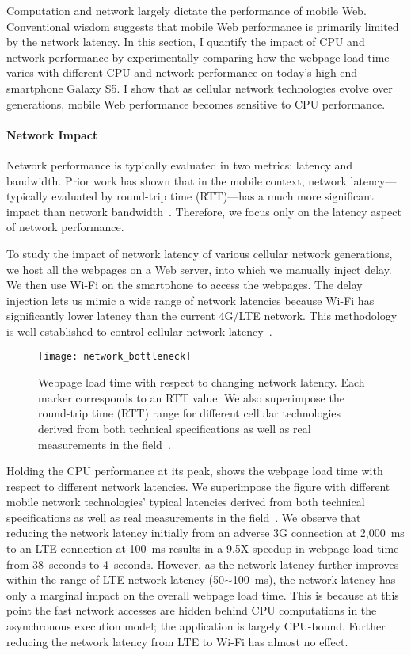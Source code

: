 Computation and network largely dictate the performance of mobile Web. Conventional wisdom suggests that mobile Web performance is primarily limited by the network latency. In this section, I quantify the impact of CPU and network performance by experimentally comparing how the webpage load time varies with different CPU and network performance on today's high-end smartphone Galaxy S5. I show that as cellular network technologies evolve over generations, mobile Web performance becomes sensitive to CPU performance.

\paragraph{Network Impact} Network performance is typically evaluated in two metrics: latency and bandwidth. Prior work has shown that in the mobile context, network latency---typically evaluated by round-trip time (RTT)---has a much more significant impact than network bandwidth~\cite{HPBN,browser-slow}. Therefore, we focus only on the latency aspect of network performance.

To study the impact of network latency of various cellular network generations, we host all the webpages on a Web server, into which we manually inject delay. We then use Wi-Fi on the smartphone to access the webpages. The delay injection lets us mimic a wide range of network latencies because Wi-Fi has significantly lower latency than the current 4G/LTE network. This methodology is well-established to control cellular network latency~\cite{browser-slow}.

\begin{figure}[t]
  \centering
  \texttt{[image: network\_bottleneck]}
  \caption{Webpage load time with respect to changing network latency. Each marker corresponds to an RTT value. We also superimpose the round-trip time (RTT) range for different cellular technologies derived from both technical specifications as well as real measurements in the field~\cite{HPBN,carrier_measure}.}
  \label{fig:network_bottleneck}
\end{figure}

Holding the CPU performance at its peak,  shows the webpage load time with respect to different network latencies. We superimpose the figure with different mobile network technologies' typical latencies derived from both technical specifications as well as real measurements in the field~\cite{HPBN,carrier_measure}. We observe that reducing the network latency initially from an adverse 3G connection at 2,000~ms to an LTE connection at 100~ms results in a 9.5X speedup in webpage load time from 38~seconds to 4~seconds. However, as the network latency further improves within the range of LTE network latency (50$\sim$100~ms), the network latency has only a marginal impact on the overall webpage load time. This is because at this point the fast network accesses are hidden behind CPU computations in the asynchronous execution model; the application is largely CPU-bound. Further reducing the network latency from LTE to Wi-Fi has almost no effect.

